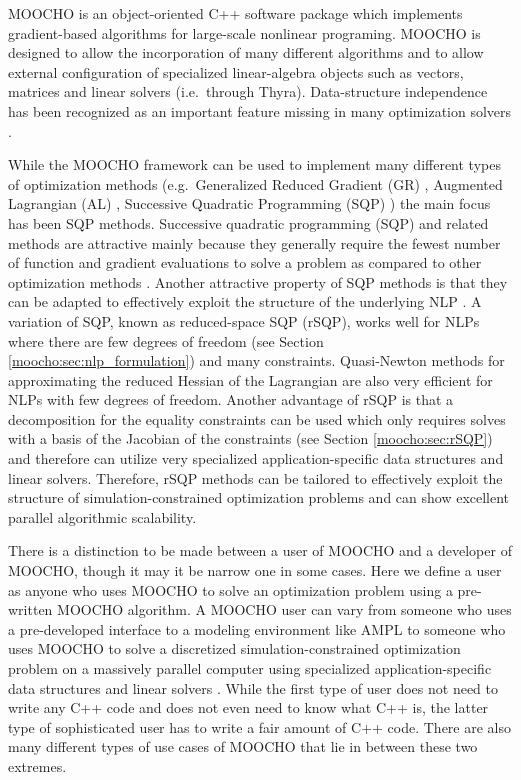 \documentclass[pdf,12pt,report]{SANDreport}
\begin{document}
MOOCHO is an object-oriented C++ software package which implements
gradient-based algorithms for large-scale nonlinear programing.  MOOCHO is
designed to allow the incorporation of many different algorithms and to allow
external configuration of specialized linear-algebra objects such as vectors,
matrices and linear solvers (i.e.\ through Thyra).  Data-structure
independence has been recognized as an important feature missing in many
optimization solvers {}\cite{ref:wright_1999}.

While the MOOCHO framework can be used to implement many different types of
optimization methods (e.g.\ Generalized Reduced Gradient (GR)
{}\cite{ref:engineering_optimization}, Augmented Lagrangian (AL)
{}\cite{JNocedal_SJWright_1999}, Successive Quadratic Programming (SQP)
{}\cite{JNocedal_SJWright_1999}) the main focus has been SQP methods.
Successive quadratic programming (SQP) and related methods are attractive
mainly because they generally require the fewest number of function and
gradient evaluations to solve a problem as compared to other optimization
methods {}\cite{ref:schmid_accel_1993}.  Another attractive property of SQP
methods is that they can be adapted to effectively exploit the structure of
the underlying NLP {}\cite{ref:varvarezos_1994}.  A variation of SQP, known as
reduced-space SQP (rSQP), works well for NLPs where there are few degrees of
freedom (see Section {}\ref{moocho:sec:nlp_formulation}) and many constraints.
Quasi-Newton methods for approximating the reduced Hessian of the Lagrangian
are also very efficient for NLPs with few degrees of freedom.  Another
advantage of rSQP is that a decomposition for the equality constraints can be
used which only requires solves with a basis of the Jacobian of the
constraints (see Section {}\ref{moocho:sec:rSQP}) and therefore can utilize
very specialized application-specific data structures and linear solvers.
Therefore, rSQP methods can be tailored to effectively exploit the structure
of simulation-constrained optimization problems and can show excellent
parallel algorithmic scalability.

There is a distinction to be made between a user of MOOCHO and a developer of
MOOCHO, though it may it be narrow one in some cases.  Here we define a user
as anyone who uses MOOCHO to solve an optimization problem using a pre-written
MOOCHO algorithm.  A MOOCHO user can vary from someone who uses a
pre-developed interface to a modeling environment like AMPL
{}\cite{ref:ampl_1993} to someone who uses MOOCHO to solve a discretized
simulation-constrained optimization problem on a massively parallel computer
using specialized application-specific data structures and linear solvers
{}\cite{ref:biros_1999}.  While the first type of user does not need to write
any C++ code and does not even need to know what C++ is, the latter type of
sophisticated user has to write a fair amount of C++ code.  There are also
many different types of use cases of MOOCHO that lie in between these two
extremes.
\end{document}
